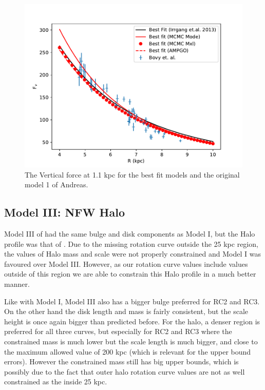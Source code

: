 \documentclass[fleqn,usenatbib]{mnras}
\begin{document}
\begin{figure}
\includegraphics[width=\columnwidth]{Model_I/Plots/Reid(2014)/VertForce_ModelI_10000_100.pdf}
\caption{The Vertical force at 1.1 kpc for the best fit models and the original model 1 of Andreas.
}
\label{fig:Model1_vertif}
\end{figure}


\subsection{Model III: NFW Halo}

Model III of \citet{andreassmass} had the same bulge and disk components as Model I, but the Halo profile was that of \citet{1997ApJ...490..493N}. Due to the missing rotation curve outside the 25 kpc region, the values of Halo mass and scale were not properly constrained and Model I was favoured over Model III. However, as our rotation curve values include values outside of this region we are able to constrain this Halo profile in a much better manner. 

Like with Model I, Model III also has a bigger bulge preferred for RC2 and RC3. On the other hand the disk length and mass is fairly consistent, but the scale height is once again bigger than predicted before. For the halo, a denser region is preferred for all three curves, but especially for RC2 and RC3 where the constrained mass is much lower but the scale length is much bigger, and close to the maximum allowed value of 200 kpc (which is relevant for the upper bound errors). However the constrained mass still has big upper bounds, which is possibly due to the fact that outer halo rotation curve values are not as well constrained as the inside 25 kpc. 
\end{document}

